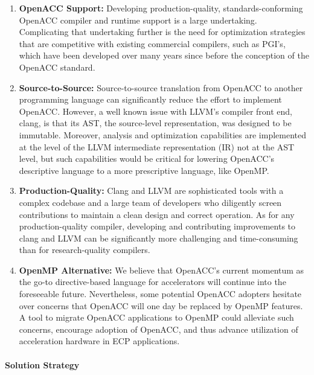 \begin{enumerate}

\item \textbf{OpenACC Support:} Developing production-quality,
standards-conforming OpenACC compiler and runtime support is a large
undertaking.  Complicating that undertaking further is the need for
optimization strategies that are competitive with existing commercial
compilers, such as PGI's, which have been developed over many years since
before the conception of the OpenACC standard.

\item \textbf{Source-to-Source:} Source-to-source translation from OpenACC
to another programming language can significantly reduce the effort to
implement OpenACC.  However, a well known issue with LLVM's compiler front
end, clang, is that its AST, the source-level representation, was designed
to be immutable.  Moreover, analysis and optimization capabilities are
implemented at the level of the LLVM intermediate representation (IR) not at
the AST level, but such capabilities would be critical for lowering
OpenACC's descriptive language to a more prescriptive language, like OpenMP.

\item \textbf{Production-Quality:} Clang and LLVM are sophisticated tools
with a complex codebase and a large team of developers who diligently screen
contributions to maintain a clean design and correct operation.  As for any
production-quality compiler, developing and contributing improvements to
clang and LLVM can be significantly more challenging and time-consuming than
for research-quality compilers.

\item \textbf{OpenMP Alternative:} We believe that OpenACC's current
momentum as the go-to directive-based language for accelerators will
continue into the foreseeable future.  Nevertheless, some potential OpenACC
adopters hesitate over concerns that OpenACC will one day be replaced by
OpenMP features.  A tool to migrate OpenACC applications to OpenMP could
alleviate such concerns, encourage adoption of OpenACC, and thus advance
utilization of acceleration hardware in ECP applications.

\end{enumerate}

\paragraph{Solution Strategy}

